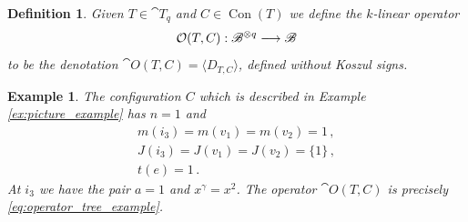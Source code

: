 \documentclass[english,letter paper,12pt,leqno]{article}
\theoremstyle{example}
\newtheorem{definition}[theorem]{Definition}
\newtheorem{example}[theorem]{Example}
\numberwithin{equation}{section}
\begin{document}
\begin{definition}\label{defn:otc} Given $T \in \cat{T}_q$ and $C \in \operatorname{Con}(T)$ we define the $k$-linear operator
\[
\mathcal{O}(T, C): \mathscr{B}^{\otimes q} \longrightarrow \mathscr{B}
\]
to be the denotation $\cat{O}(T,C) = \langle D_{T,C} \rangle$, defined without Koszul signs.
\end{definition}

\begin{example}\label{ex:picture_example_2} The configuration $C$ which is described in Example \ref{ex:picture_example} has $n = 1$ and
\begin{gather*}
m(i_3) = m(v_1) = m(v_2) = 1\,,\\
J(i_3) = J(v_1) = J(v_2) = \{ 1 \}\,,\\
t(e) = 1\,.
\end{gather*}
At $i_3$ we have the pair $a = 1$ and $x^\gamma = x^2$. The operator $\cat{O}(T,C)$ is precisely \eqref{eq:operator_tree_example}.
\end{example}
\end{document}
